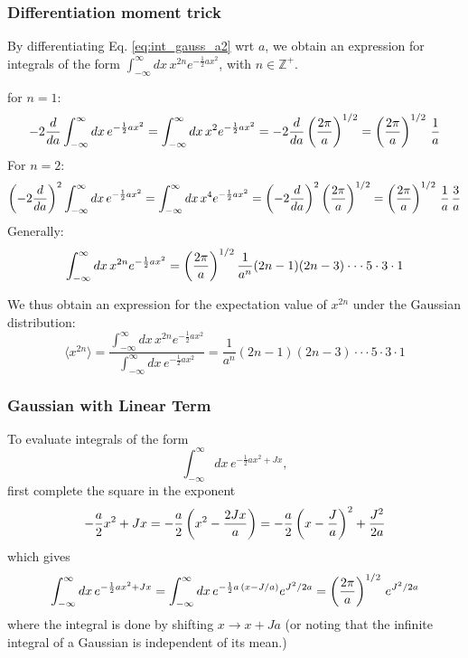 \documentclass[11pt]{article}
\begin{document}
\subsubsection{Differentiation moment trick}
\label{subsubsec:dmt}
By differentiating Eq. \ref{eq:int_gauss_a2} wrt $a$, we obtain an expression for
integrals of the form $\int_{-\infty}^{\infty}dx \, x^{2n} e^{-\frac{1}{2} a x^2}$, with
$n \in \mathbb{Z^+}$.

\eeg for $n=1$:
\begin{equation}
  - 2 \frac{d}{da} \int_{-\infty}^{\infty}dx \, e^{-\frac{1}{2} a x^2} =
  \int_{-\infty}^{\infty}dx \, x^2 e^{-\frac{1}{2} a x^2} =
  - 2 \frac{d}{da} \left( \frac{2\pi}{a} \right)^{1/2} =
  \left( \frac{2\pi}{a} \right)^{1/2} \, \frac{1}{a} 
\end{equation}
For $n=2$:
\begin{equation}
  \left( -2 \frac{d}{da} \right)^2 \int_{-\infty}^{\infty}dx \, e^{-\frac{1}{2} a x^2} =
  \int_{-\infty}^{\infty}dx \, x^4 e^{-\frac{1}{2} a x^2} =
  \left( -2 \frac{d}{da} \right)^2 \left( \frac{2\pi}{a} \right)^{1/2} =
  \left( \frac{2\pi}{a} \right)^{1/2} \, \frac{1}{a} \, \frac{3}{a}
\end{equation}
Generally:
\begin{equation}
  \int_{-\infty}^{\infty}dx \, x^{2n} e^{-\frac{1}{2} a x^2} =
  \left( \frac{2\pi}{a} \right)^{1/2} \frac{1}{a^n} (2n-1) (2n-3) \cdot\cdot\cdot 5 \cdot 3
  \cdot 1 
\end{equation}

We thus obtain an expression for the expectation value of $x^{2n}$ under the Gaussian
distribution: 
\begin{equation}
  \label{eq:x2n_moments}
  \langle x^{2n} \rangle =
  \frac{\int_{-\infty}^{\infty}dx \, x^{2n} e^{-\frac{1}{2} a x^2}}
       {\int_{-\infty}^{\infty}dx \, e^{-\frac{1}{2} a x^2}} =
  \frac{1}{a^n} (2n-1) (2n-3) \cdot\cdot\cdot 5 \cdot 3 \cdot 1
\end{equation}

\subsubsection{Gaussian with Linear Term}
To evaluate integrals of the form
\begin{equation}
  \label{eq:int_gauss_a2_j}
  \int_{-\infty}^{\infty} dx\, e^{-\frac{1}{2} a x^2 + J x},
\end{equation}
first complete the square in the exponent
\begin{equation}
  -\frac{a}{2} x^2 + J x = -\frac{a}{2} \left( x^2 - \frac{2Jx}{a} \right) =
  -\frac{a}{2} \left( x - \frac{J}{a} \right)^2 + \frac{J^2}{2a}
\end{equation}
which gives
\begin{equation}
  \int_{-\infty}^{\infty} dx\, e^{-\frac{1}{2} a x^2 + J x} =
  \int_{-\infty}^{\infty} dx\, e^{-\frac{1}{2} a\, \left( x - J/a \right)} e^{J^2 / 2a} =
  \left(\frac{2\pi}{a} \right)^{1/2} \, e^{J^2 / 2a}
\end{equation}
where the integral is done by shifting $x \to x + J a$ (or noting that the infinite
integral of a Gaussian is independent of its mean.)
\end{document}
